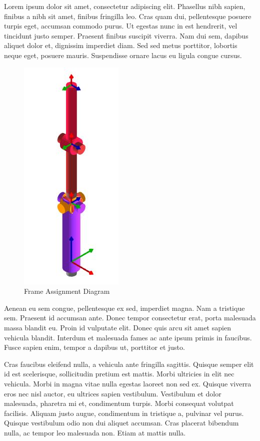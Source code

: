 \documentclass[11pt]{article}
\begin{document}
Lorem ipsum dolor sit amet, consectetur adipiscing elit. Phasellus nibh sapien, finibus a nibh sit amet, finibus fringilla leo. Cras quam dui, pellentesque posuere turpis eget, accumsan commodo purus. Ut egestas nunc in est hendrerit, vel tincidunt justo semper. Praesent finibus suscipit viverra. Nam dui sem, dapibus aliquet dolor et, dignissim imperdiet diam. Sed sed metus porttitor, lobortis neque eget, posuere mauris. Suspendisse ornare lacus eu ligula congue cursus.
\begin{figure}
\begin{center}
\includegraphics[scale=0.5]{report/3d_frame.JPG}
\caption{Frame Assignment Diagram}
\end{center}
\end{figure}
Aenean eu sem congue, pellentesque ex sed, imperdiet magna. Nam a tristique sem. Praesent id accumsan ante. Donec tempor consectetur erat, porta malesuada massa blandit eu. Proin id vulputate elit. Donec quis arcu sit amet sapien vehicula blandit. Interdum et malesuada fames ac ante ipsum primis in faucibus. Fusce sapien enim, tempor a dapibus ut, porttitor et justo.

Cras faucibus eleifend nulla, a vehicula ante fringilla sagittis. Quisque semper elit id est scelerisque, sollicitudin pretium est mattis. Morbi ultricies in elit nec vehicula. Morbi in magna vitae nulla egestas laoreet non sed ex. Quisque viverra eros nec nisl auctor, eu ultrices sapien vestibulum. Vestibulum et dolor malesuada, pharetra mi et, condimentum turpis. Morbi consequat volutpat facilisis. Aliquam justo augue, condimentum in tristique a, pulvinar vel purus. Quisque vestibulum odio non dui aliquet accumsan. Cras placerat bibendum nulla, ac tempor leo malesuada non. Etiam at mattis nulla.
\end{document}
